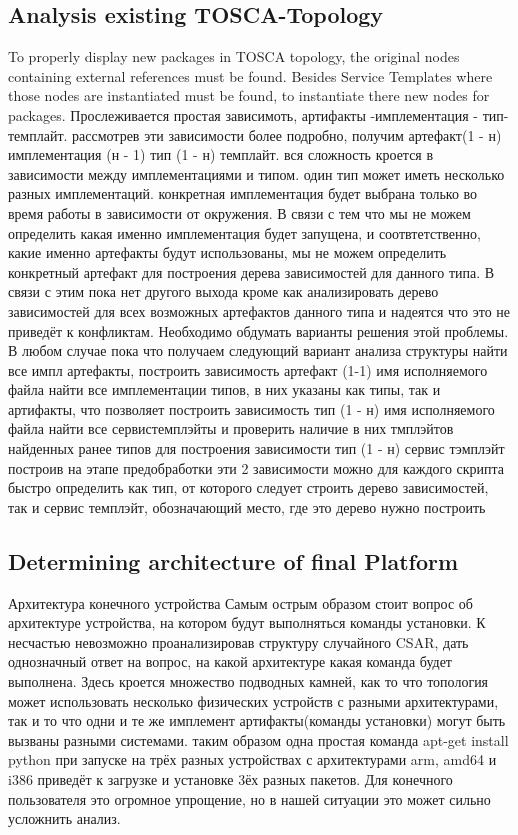 \subsection{Analysis existing TOSCA-Topology}\label{subs:analyse}
To properly display new packages in TOSCA topology, the original nodes containing external references must be found.
Besides Service Templates where those nodes are instantiated must be found, to instantiate there new nodes for packages.
Прослеживается простая зависимоть, артифакты -имплементация - тип- темплайт. рассмотрев эти зависимости более подробно, получим  артефакт(1 - н) имплементация (н - 1) тип (1 - н) темплайт.
вся сложность кроется в зависимости между имплементациями и типом. один тип может иметь несколько разных имплементаций. конкретная имплементация будет выбрана только во время работы в зависимости от окружения. В связи с тем что мы не можем определить какая именно имплементация будет запущена, и соотвтетственно, какие именно артефакты будут использованы, мы не можем определить конкретный артефакт для построения дерева зависимостей для данного типа. В связи с этим пока нет другого выхода кроме как анализировать дерево зависимостей для всех возможных артефактов данного типа и надеятся что это не приведёт к конфликтам. Необходимо обдумать варианты решения этой проблемы.
В любом случае пока что получаем следующий вариант анализа структуры
найти все импл артефакты, построить зависимость артефакт (1-1) имя исполняемого файла
найти все имплементации типов, в них указаны как типы, так и артифакты, что позволяет построить зависимость тип (1 - н) имя исполняемого файла
найти все сервистемплэйты и проверить наличие в них тмплэйтов найденных ранее типов для построения зависимости тип (1 - н) сервис тэмплэйт
построив на этапе предобработки эти 2 зависимости можно для каждого скрипта быстро определить как тип, от которого следует строить дерево зависимостей, так и сервис темплэйт, обозначающий место, где это дерево нужно построить

\fi
\subsection{Determining architecture of final Platform}
Архитектура конечного устройства
Самым острым образом стоит вопрос об архитектуре устройства, на котором будут выполняться команды установки. 
К несчастью невозможно проанализировав структуру случайного CSAR, дать однозначный ответ на вопрос, на какой архитектуре какая команда будет выполнена. Здесь кроется множество подводных камней, как то что топология может использовать несколько физических устройств с разными архитектурами, так и то что одни и те же имплемент артифакты(команды установки) могут быть вызваны разными системами. таким образом одна простая команда apt-get install python при запуске на трёх разных устройствах с архитектурами arm, amd64 и i386 приведёт к загрузке и установке 3ёх разных пакетов. Для конечного пользователя это огромное упрощение, но в нашей ситуации это может сильно усложнить анализ.

